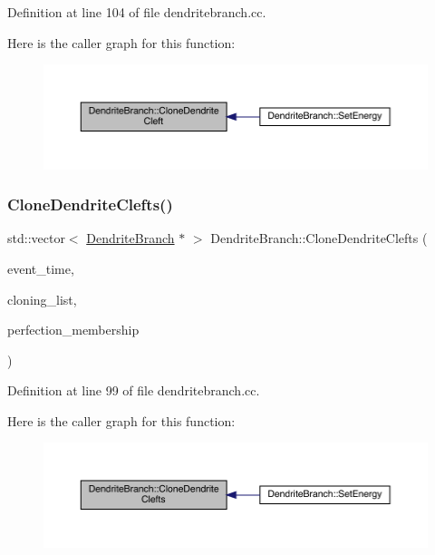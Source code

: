 Definition at line 104 of file dendritebranch.\+cc.

Here is the caller graph for this function\+:\nopagebreak
\begin{figure}[H]
\begin{center}
\leavevmode
\includegraphics[width=350pt]{class_dendrite_branch_a45d2fea350165fe0c81f1f429aa96061_icgraph}
\end{center}
\end{figure}
\mbox{\label{class_dendrite_branch_a3cf1e07fe5e0ea827965c0dc76881c9f}} 
\subsubsection{\texorpdfstring{Clone\+Dendrite\+Clefts()}{CloneDendriteClefts()}}
{\footnotesize\ttfamily std\+::vector$<$ \hyperlink{class_dendrite_branch}{Dendrite\+Branch} $\ast$ $>$ Dendrite\+Branch\+::\+Clone\+Dendrite\+Clefts (\begin{DoxyParamCaption}\item[{std\+::chrono\+::time\+\_\+point$<$ \hyperlink{universe_8h_a0ef8d951d1ca5ab3cfaf7ab4c7a6fd80}{Clock} $>$}]{event\+\_\+time,  }\item[{std\+::vector$<$ \hyperlink{class_dendrite_branch}{Dendrite\+Branch} $\ast$$>$}]{cloning\+\_\+list,  }\item[{double}]{perfection\+\_\+membership }\end{DoxyParamCaption})}



Definition at line 99 of file dendritebranch.\+cc.

Here is the caller graph for this function\+:\nopagebreak
\begin{figure}[H]
\begin{center}
\leavevmode
\includegraphics[width=350pt]{class_dendrite_branch_a3cf1e07fe5e0ea827965c0dc76881c9f_icgraph}
\end{center}
\end{figure}
\mbox{\label{class_dendrite_branch_a4f751442a537f2e3d7d0dc66a09bd84b}} 
